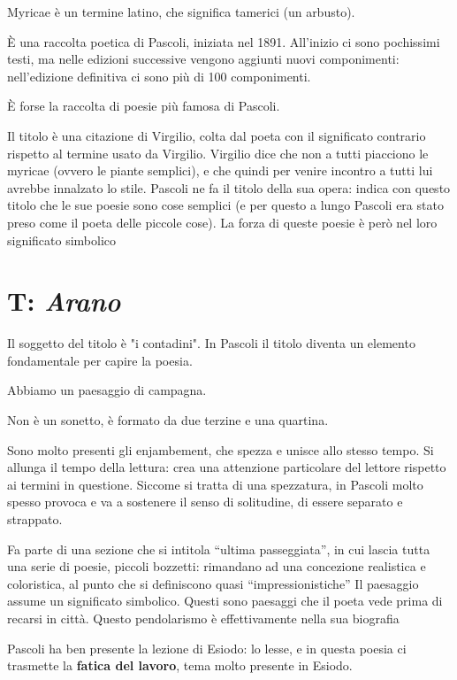 Myricae è un termine latino, che significa tamerici (un arbusto).

È una raccolta poetica di Pascoli, iniziata nel 1891. All'inizio ci sono pochissimi testi, ma nelle edizioni successive vengono aggiunti nuovi componimenti: nell'edizione definitiva ci sono più di 100 componimenti.

È forse la raccolta di poesie più famosa di Pascoli.

Il titolo è una citazione di Virgilio, colta dal poeta con il significato contrario rispetto al termine usato da Virgilio.
Virgilio dice che non a tutti piacciono le myricae (ovvero le piante semplici), e che quindi per venire incontro a tutti lui avrebbe innalzato lo stile.
Pascoli ne fa il titolo della sua opera: indica con questo titolo che le sue poesie sono cose semplici (e per questo a lungo Pascoli era stato preso come il poeta delle piccole cose). La forza di queste poesie è però nel loro significato simbolico

\section{T: \textit{Arano}}

Il soggetto del titolo è "i contadini". In Pascoli il titolo diventa un elemento fondamentale per capire la poesia.

Abbiamo un paesaggio di campagna.

Non è un sonetto, è formato da due terzine e una quartina.

Sono molto presenti gli enjambement, che spezza e unisce allo stesso tempo. Si allunga il tempo della lettura: crea una attenzione particolare del lettore rispetto ai termini in questione.
Siccome si tratta di una spezzatura, in Pascoli molto spesso provoca e va a sostenere il senso di solitudine, di essere separato e strappato.

Fa parte di una sezione che si intitola “ultima passeggiata”, in cui lascia tutta una serie di poesie, piccoli bozzetti: rimandano ad una concezione realistica e coloristica, al punto che si definiscono quasi “impressionistiche”
Il paesaggio assume un significato simbolico.
Questi sono paesaggi che il poeta vede prima di recarsi in città.
Questo pendolarismo è effettivamente nella sua biografia

Pascoli ha ben presente la lezione di Esiodo: lo lesse, e in questa poesia ci trasmette la \textbf{fatica del lavoro}, tema molto presente in Esiodo.

